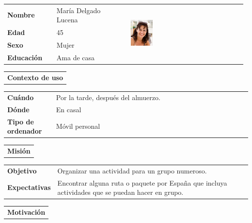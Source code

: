 \documentclass[11pt]{article}
\begin{document}
\begin{table}[H]
	\centering
	\begin{tabular}{p{0.2\linewidth}|p{0.3\linewidth}p{0.475\linewidth}}
		\toprule
		\textbf{Nombre} & María Delgado Lucena &\multirow{4}{*}{\begin{minipage}{1.\textwidth}\includegraphics[width=0.2\textwidth, height=30mm]{Maria}\end{minipage}}\\
		\textbf{Edad} & 45 & \\
		\textbf{Sexo} & Mujer & \\
		\textbf{Educación} & Ama de casa & \\
		\bottomrule
	\end{tabular}
	
	\begin{tabular}{l}
		\textbf{Contexto de uso} 
	\end{tabular}
	
	\begin{tabular}{p{0.2\linewidth}|p{0.8\linewidth}}
		\toprule
		\textbf{Cuándo} & Por la tarde, después del almuerzo. \\
		\textbf{Dónde}  & En casal\\
		\textbf{Tipo de ordenador} & Móvil personal\\
		\bottomrule
	\end{tabular}
	
	\begin{tabular}{l}
		\textbf{Misión} 
	\end{tabular}
	
	\begin{tabular}{p{0.2\linewidth}|p{0.8\linewidth}}
		\toprule
		\textbf{Objetivo} & Organizar una actividad para un grupo numeroso.\\
		\textbf{Expectativas}  & Encontrar alguna ruta o paquete por España que incluya actividades que se puedan hacer en grupo. \\
		\bottomrule
	\end{tabular}
	
	\begin{tabular}{l}
		\textbf{Motivación} 
	\end{tabular}
	

\end{table}
\end{document}

